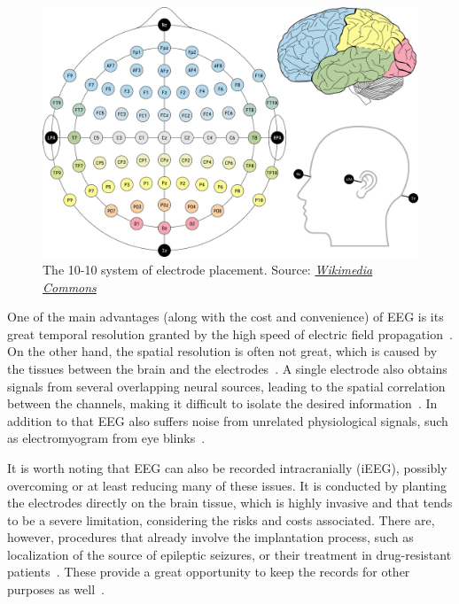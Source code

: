 \documentclass[english, he, bc, kiv, iso690alph, viewonly]{fasthesis}
\begin{document}
\begin{figure}
	\label{fig:channels}
	\includegraphics[width=\textwidth]{fig/channels.png}
	\caption[The 10-10 system of electrode placement]{The 10-10 system of electrode placement. Source: \href{https://commons.wikimedia.org/wiki/File:EEG_10-10_system_with_additional_information.svg}{\textit{Wikimedia Commons}}}
\end{figure}

One of the main advantages (along with the cost and convenience) of EEG is its great temporal resolution granted by the high speed of electric field propagation~\cite{roy:eeg:review:19}. On the other hand, the spatial resolution is often not great, which is caused by the tissues between the brain and the electrodes~\cite{roy:eeg:review:19, berezutskaya:ieeg:22}. A single electrode also obtains signals from several overlapping neural sources, leading to the spatial correlation between the channels, making it difficult to isolate the desired information~\cite{roy:eeg:review:19, luck:erp:book}. In addition to that EEG also suffers noise from unrelated physiological signals, such as electromyogram from eye blinks~\cite{craik:dl:eeg:rev:19}.

It is worth noting that EEG can also be recorded intracranially (iEEG), possibly overcoming or at least reducing many of these issues. It is conducted by planting the electrodes directly on the brain tissue, which is highly invasive and that tends to be a severe limitation, considering the risks and costs associated. There are, however, procedures that already involve the implantation process, such as localization of the source of epileptic seizures, or their treatment in drug-resistant patients~\cite{jobst:iEEG:20}. These provide a great opportunity to keep the records for other purposes as well~\cite{berezutskaya:ieeg:22}.
\end{document}
